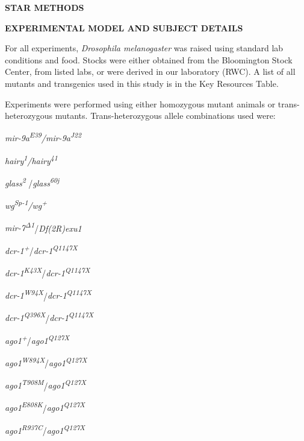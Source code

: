 \textbf{STAR METHODS}

\textbf{EXPERIMENTAL MODEL AND SUBJECT DETAILS }

For all experiments, \emph{Drosophila melanogaster} was raised using standard lab conditions and food. Stocks were either obtained from the Bloomington Stock Center, from listed labs, or were derived in our laboratory (RWC). A list of all mutants and transgenics used in this study is in the Key Resources Table.

Experiments were performed using either homozygous mutant animals or trans-heterozygous mutants. Trans-heterozygous allele combinations used were:

\emph{mir-9a\textsuperscript{E39}/mir-9a\textsuperscript{J22}}

\emph{hairy\textsuperscript{1}/hairy\textsuperscript{41}}

\emph{glass\textsuperscript{2 }}/\emph{glass\textsuperscript{60j}}

\emph{wg\textsuperscript{Sp-1}/wg\textsuperscript{+}}

\emph{mir-7\textsuperscript{Δ1}}/\emph{Df(2R)exu1}

\emph{dcr-1\textsuperscript{+}}/\emph{dcr-1\textsuperscript{Q1147X}}

\emph{dcr-1\textsuperscript{K43X}}/\emph{dcr-1\textsuperscript{Q1147X}}

\emph{dcr-1\textsuperscript{W94X}}/\emph{dcr-1\textsuperscript{Q1147X}}

\emph{dcr-1\textsuperscript{Q396X}}/\emph{dcr-1\textsuperscript{Q1147X}}

\emph{ago1\textsuperscript{+}}/\emph{ago1\textsuperscript{Q127X}}

\emph{ago1\textsuperscript{W894X}}/\emph{ago1\textsuperscript{Q127X}}

\emph{ago1\textsuperscript{T908M}}/\emph{ago1\textsuperscript{Q127X}}

\emph{ago1\textsuperscript{E808K}}/\emph{ago1\textsuperscript{Q127X}}

\emph{ago1\textsuperscript{R937C}}/\emph{ago1\textsuperscript{Q127X}}

